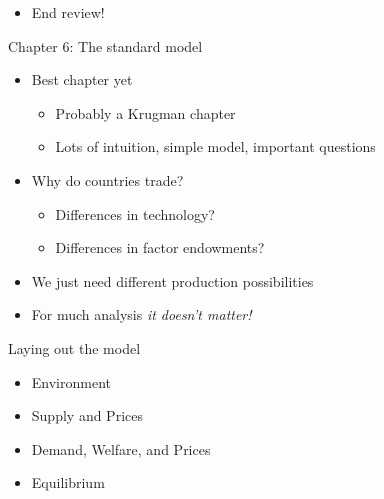\documentclass[ignorenonframetext,]{beamer}
\begin{document}
\begin{frame}
    \begin{itemize}
        \item End review!
    \end{itemize}
\end{frame}

\begin{frame}{Chapter 6: The standard model}

    \begin{itemize}
        \item Best chapter yet 
        \begin{itemize}
            \item Probably a Krugman chapter
            \item Lots of intuition, simple model, important questions
        \end{itemize}
        \item Why do countries trade?
        \begin{itemize}
            \item Differences in technology?
            \item Differences in factor endowments?
        \end{itemize}
        \item We just need different production possibilities
        \item For much analysis \emph{it doesn't matter!}
    \end{itemize}
            
\end{frame}

\begin{frame}{Laying out the model}

    \begin{itemize}
        \item Environment 
        \item Supply and Prices
        \item Demand, Welfare, and Prices
        \item Equilibrium
    \end{itemize}
            
\end{frame}
\end{document}
